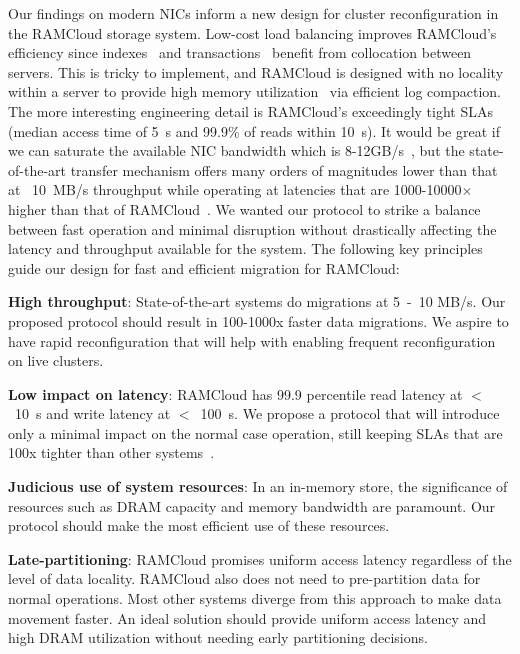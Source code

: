 Our findings on modern NICs inform a new design for cluster reconfiguration
in the RAMCloud storage system. Low-cost load balancing improves RAMCloud's
efficiency since indexes~\cite{slik} and transactions~\cite{ramcloudtx} benefit from collocation between servers.
This is tricky to implement, and RAMCloud is designed with no locality within a 
server to provide high memory utilization~\cite{ramcloudfast} via efficient log compaction.
The more interesting engineering detail is RAMCloud's exceedingly tight SLAs (median
access time of 5~\textmu s and 99.9\% of reads within 10~\textmu s). It would be great if we can saturate the
available NIC bandwidth which is 8-12GB/s~\cite{cx3,cx4}, but the state-of-the-art 
transfer mechanism offers many orders of magnitudes lower than that at ~10~MB/s 
throughput while operating at latencies that are 1000-10000$\times$ higher than that of RAMCloud~\cite{ramcloud}.
We wanted our protocol to strike a balance between fast operation and minimal disruption without drastically affecting
the latency and throughput available for the system. The following key principles guide our design for fast and 
efficient migration for RAMCloud:
\begin{myitemize}
\item{\textbf{High throughput}}: State-of-the-art systems do migrations at 5~-~10 MB/s. Our proposed protocol
should result in 100-1000x faster data migrations. We aspire to have rapid reconfiguration that will 
help with enabling frequent reconfiguration on live clusters.
\item{\textbf{Low impact on latency}}: RAMCloud has 99.9 percentile read latency at $<$~10~\textmu s \linebreak and write latency
at $<$~100~\textmu s. We propose a protocol that will introduce only a minimal impact on the normal case operation, still keeping
SLAs that are 100x tighter \linebreak than other systems~\cite{squall}.
\item{\textbf{Judicious use of system resources}}: In an in-memory store, the significance of \linebreak resources such as DRAM capacity and
memory bandwidth are paramount. Our \linebreak protocol should make the most efficient use of these resources.
\item{\textbf{Late-partitioning}}: RAMCloud promises uniform access latency regardless of the level of data locality.
RAMCloud also does not need to pre-partition data for normal operations. Most other systems diverge from this 
approach to make data movement faster. An ideal solution should provide uniform access latency and high DRAM utilization 
without needing early partitioning decisions.
\end{myitemize}

